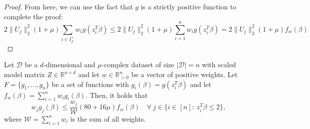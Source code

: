 \begin{proof}
    From here, we can use the fact that $g$ is a strictly positive function
    to complete the proof:
    \begin{equation*}
        2 \lVert U_j \rVert_2^2 (1 + \mu) \sum_{i \in I_\beta^+} w_i g(z_i^T \beta)
        \leq 2 \lVert U_j \rVert_2^2 (1 + \mu) \sum_{i = 1}^n w_i g(z_i^T \beta)
        = 2 \lVert U_j \rVert_2^2 (1 + \mu) f_w(\beta)
    \end{equation*}
\end{proof}

\begin{lemma}
    \label{lemma:g-bounds-2}
    Let $\mathcal{D}$ be a $d$-dimensional and $\mu$-complex dataset of size
    $|\mathcal{D}|=n$ with scaled model matrix
    $Z \in \mathbb{R}^{n \times d}$ and let $w \in \mathbb{R}^n_{>0}$
    be a vector of positive weights.
    Let $F = \{g_1, ..., g_n\}$ be a set of functions with
    $g_i(\beta) = g(z_i^T \beta)$ and let
    $f_w(\beta) = \sum_{i=1}^n w_ig_i(\beta)$.
    Then, it holds that
    \begin{equation*}
        w_jg_j(\beta) \leq \frac{w_j}{\mathcal{W}}(80 + 16 \mu)f_w(\beta) \quad
        \forall\ j \in \{i \in [n]:\ z_i^T \beta \leq 2 \},
    \end{equation*}
    where $\mathcal{W} = \sum_{i=1}^n w_i$ is the sum of all weights.
\end{lemma}
